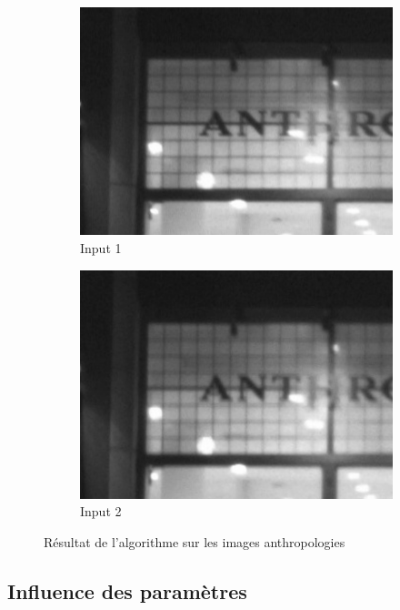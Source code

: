 \documentclass[a4paper,10pt]{report}
\begin{document}
\begin{figure}[h]
 
  \begin{subfigure}{0.24\textwidth}
    \includegraphics[width=0.9\linewidth]{ressource/detail_anthro1.png} 
    \caption{Input 1}
    \label{fig:anthro1}
  \end{subfigure}
  
  \begin{subfigure}{0.24\textwidth}
   \includegraphics[width=0.9\linewidth]{ressource/detail_anthro2.png} 
    \caption{Input 2}
    \label{fig:anthro2}
  \end{subfigure}
  
  

  \caption{Résultat de l'algorithme sur les images anthropologies}
\label{fig:anthro}
\end{figure}

\subsection{Influence des paramètres}
\end{document}
